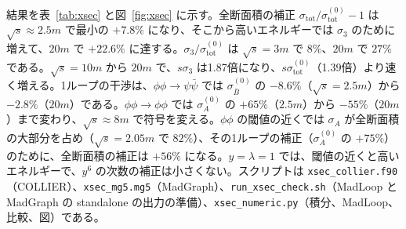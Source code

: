 \documentclass[a4paper,10pt]{ltjsarticle}
\begin{document}
結果を表~\ref{tab:xsec} と図~\ref{fig:xsec} に示す。全断面積の補正 $\sigma_{\mathrm{tot}}/\sigma_{\mathrm{tot}}^{(0)}-1$ は $\sqrt s\approx2.5m$ で最小の $+7.8\%$ になり、そこから高いエネルギーでは $\sigma_3$ のために増えて、$20m$ で $+22.6\%$ に達する。$\sigma_3/\sigma_{\mathrm{tot}}^{(0)}$ は $\sqrt s=3m$ で $8\%$、$20m$ で $27\%$ である。$\sqrt s=10m$ から $20m$ で、$s\sigma_3$ は1.87倍になり、$s\sigma_{\mathrm{tot}}^{(0)}$（1.39倍）より速く増える。1ループの干渉は、$\phi\phi\to\psi\bar\psi$ では $\sigma_{\bar B}^{(0)}$ の $-8.6\%$（$\sqrt s=2.5m$）から $-2.8\%$（$20m$）である。$\phi\phi\to\phi\phi$ では $\sigma_A^{(0)}$ の $+65\%$（$2.5m$）から $-55\%$（$20m$）まで変わり、$\sqrt s\approx8m$ で符号を変える。$\phi\phi$ の閾値の近くでは $\sigma_A$ が全断面積の大部分を占め（$\sqrt s=2.05m$ で $82\%$）、その1ループの補正（$\sigma_A^{(0)}$ の $+75\%$）のために、全断面積の補正は $+56\%$ になる。$y=\lambda=1$ では、閾値の近くと高いエネルギーで、$y^6$ の次数の補正は小さくない。スクリプトは \texttt{xsec\_collier.f90}（COLLIER）、\texttt{xsec\_mg5.mg5}（MadGraph）、\texttt{run\_xsec\_check.sh}（MadLoop と MadGraph の standalone の出力の準備）、\texttt{xsec\_numeric.py}（積分、MadLoop、比較、図）である。
\end{document}
